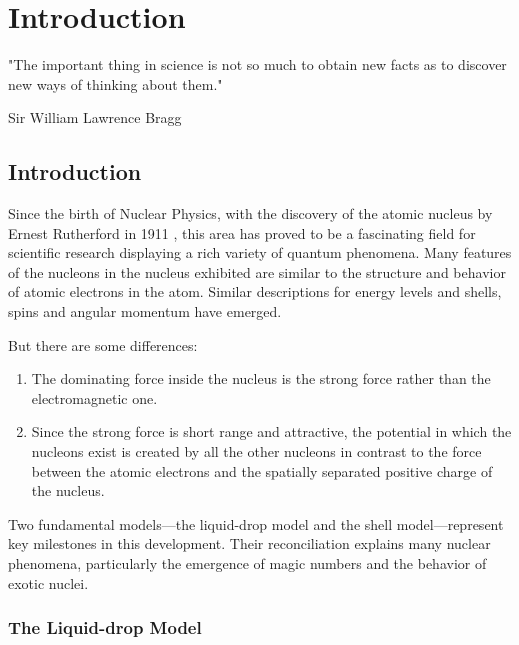 
%

\chapter{Introduction}
\label{cha:introduction}

\epigraph{
  "The important thing in science is not so much to obtain new facts as to discover new ways of thinking about them."
}{Sir William Lawrence Bragg}

\section{Introduction}

Since the birth of Nuclear Physics, with the discovery of the atomic nucleus by Ernest Rutherford in 1911 \cite{rutherford_lxxix_1911}, this area has proved to be a fascinating field for scientific research displaying a rich variety of quantum phenomena.
Many features of the nucleons in the nucleus exhibited are similar to the structure and behavior of atomic electrons in the atom. Similar descriptions for energy levels and shells, spins and angular momentum have emerged.

But there are some differences:
\begin{enumerate}
	\item The dominating force inside the nucleus is the strong force rather than the electromagnetic one.
	\item Since the strong force is short range and attractive, the potential in which the nucleons exist is created by all the other nucleons in contrast to the force between the atomic electrons and the spatially separated positive charge of the nucleus.
\end{enumerate}

Two fundamental models—the liquid-drop model and the shell model—represent key milestones in this development. Their reconciliation explains many nuclear phenomena, particularly the emergence of magic numbers and the behavior of exotic nuclei.

\subsection{The Liquid-drop Model}

